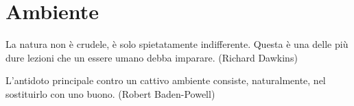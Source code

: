 \section{Ambiente}

\label{ambiente}
\begin{changemargin}{0.3cm}{0.3cm}\begin{enfasi}{
La natura non è crudele, è solo spietatamente indifferente. Questa è una delle più dure lezioni che un essere umano debba imparare. (Richard Dawkins)

\medskip

L'antidoto principale contro un cattivo ambiente consiste, naturalmente, nel sostituirlo con uno buono. (Robert Baden-Powell)}\end{enfasi}\end{changemargin}\medskip

